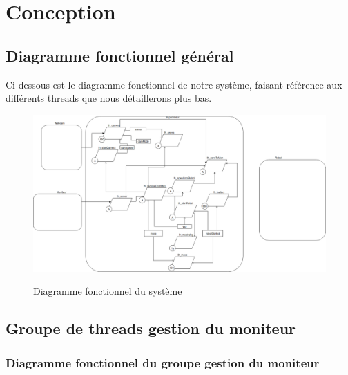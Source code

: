 \documentclass[11pt, a4paper]{paper}
\begin{document}
\newpage




\section{Conception}

\subsection{Diagramme fonctionnel général}

{Ci-dessous est le diagramme fonctionnel de notre système, faisant référence aux différents threads que nous détaillerons plus bas.}

\begin{figure}[htbp]
\begin{center}
{\includegraphics[scale=.3]{./dossier_conception/conception_generale}}
{\caption{Diagramme fonctionnel du système}}
\end{center}
\label{fig:diag_fonc_gen}
\end{figure}
\FloatBarrier

\subsection{Groupe de threads gestion du moniteur}


\subsubsection{Diagramme fonctionnel du groupe gestion du moniteur}
\end{document}
